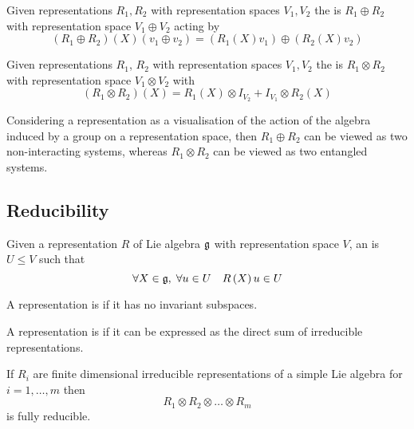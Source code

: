 \documentclass{article}
\begin{document}
\begin{definition}
	Given representations $R_1, R_2$ with representation spaces $V_1, V_2$ the  is $R_1 \oplus R_2$ with representation space $V_1 \oplus V_2$ acting by 
	\[
	(R_1 \oplus R_2)(X)(v_1 \oplus v_2)=(R_1(X)v_1)\oplus(R_2(X)v_2)
	\]
\end{definition}

\begin{definition}
	Given representations $R_1$, $R_2$ with representation spaces $V_1, V_2$ the  is $R_1 \otimes R_2$ with representation space $V_1 \otimes V_2$ with
	\[
	(R_1 \otimes R_2)(X)=R_1(X)\otimes I_{V_2}+I_{V_1}\otimes R_2(X)
	\]
\end{definition}

\begin{idea}
	Considering a representation as a visualisation of the action of the algebra induced by a  group on a representation space, then $R_1 \oplus R_2$ can be viewed as two non-interacting systems, whereas $R_1 \otimes R_2$ can be viewed as two entangled systems.
\end{idea}

\subsection{Reducibility}
\begin{definition}
	Given a representation $R$ of Lie algebra $\mathfrak{g}$ with representation space $V$, an  is $U\leq V$ such that
	\[
	\forall X\in\mathfrak{g}, \; \forall u\in U \quad R\left(X\right)u\in U
	\]
\end{definition}

\begin{definition}
	A representation is  if it has no invariant subspaces. 
\end{definition}

\begin{definition}
	A representation is  if it can be expressed as the direct sum of irreducible representations. 
\end{definition}

\begin{fact}
	If $R_i$ are finite dimensional irreducible representations of a simple Lie algebra for $i=1,\dots,m$ then
	\[
	R_1 \otimes R_2 \otimes \dots \otimes R_m
	\]
	is fully reducible. 
\end{fact}
\end{document}
